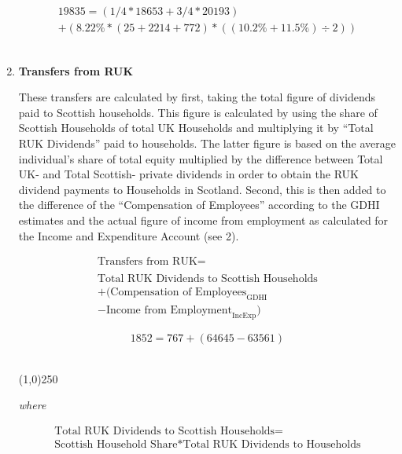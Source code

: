 \begin{enumerate}
\begin{equation} \nonumber
\begin{split}
19835 = (1/4*18653+3/4*20193)\\
+(8.22\%*(25+2214+772)*((10.2\%+11.5\%)\div 2))
\end{split}
\end{equation}\\


\item \textbf {Transfers from RUK}

These transfers are calculated by first, taking the total figure of dividends paid to Scottish households. This figure is calculated by using the share of Scottish Households of total UK Households and multiplying it by “Total RUK Dividends” paid to households. The latter figure is based on the average individual’s share of total equity multiplied by the difference between Total UK- and Total Scottish- private dividends in order to obtain the RUK dividend payments to Households in Scotland. 
Second, this is then added to the difference of the “Compensation of Employees” according to the GDHI estimates and the actual figure of income from employment as calculated for the Income and Expenditure Account (see 2).
\cite{ONS2011c,ONS2011a,ONS2011b}


\begin{equation}
\begin{split}
\text{Transfers from RUK} =  \\ \\
\text{Total RUK Dividends to Scottish Households}\\
+(\text{Compensation of Employees}_\text{GDHI}\\
-\text{Income from Employment}_\text{IncExp})
\end{split} \label{eq:2.5.9}
\end{equation}

\begin{equation} \nonumber
1852 = 767+(64645-63561)
\end{equation}\\

\begin{center}
\line(1,0){250}
\end{center}

\textit{where}

\begin{equation}
\begin{split}
\text{Total RUK Dividends to Scottish Households}=\\
\text{Scottish Household Share}*\text{Total RUK Dividends to Households}
\end{split} \label{eq:2.5.10}
\end{equation}


\end{enumerate}
